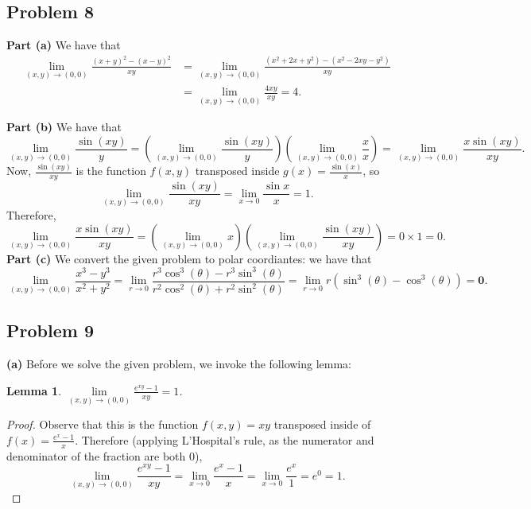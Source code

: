\documentclass[11pt]{article}
\newtheorem*{lemma*}{Lemma}
\begin{document}

\subsection{Problem 8}

\textbf{Part (a)} We have that 
\begin{align*}
	\lim\limits_{(x, y) \to (0, 0)} \frac{(x + y)^{2} - (x - y)^{2}}{xy} &= \lim\limits_{(x, y) \to (0, 0)} \frac{(x^{2} + 2x + y^{2}) - (x^{2} - 2xy - y^{2})}{xy} \\
	&= \lim\limits_{(x, y) \to (0, 0)} \frac{4xy}{xy} = 4.
\end{align*}

\textbf{Part (b)} We have that
\[
	\lim\limits_{(x, y) \to (0, 0)} \frac{\sin(xy)}{y} = \left( \lim\limits_{(x, y) \to (0, 0)} \frac{\sin(xy)}{y} \right) \left( \lim\limits_{(x, y) \to (0, 0)} \frac{x}{x} \right) = \lim\limits_{(x, y) \to (0, 0)} \frac{x\sin(xy)}{xy}.
\]
Now, $\tfrac{\sin(xy)}{xy}$ is the function $f(x, y)$ transposed inside $g(x) = \tfrac{\sin(x)}{x}$, so 
\[
	\lim\limits_{(x, y) \to (0, 0)} \frac{\sin(xy)}{xy} = \lim\limits_{x \to 0} \frac{\sin{x}}{x} = 1.
\]
Therefore,
\[
	\lim\limits_{(x, y) \to (0, 0)} \frac{x\sin(xy)}{xy} = \left( \lim\limits_{(x, y) \to (0, 0)} x \right) \left( \lim\limits_{(x, y) \to (0, 0)} \frac{\sin(xy)}{xy} \right) = 0 \times 1 = 0.
\]
\textbf{Part (c)} We convert the given problem to polar coordiantes: we have that
\[
	\lim\limits_{(x, y) \to (0, 0)} \frac{x^{3} - y^{3}}{x^{2} + y^{2}} = \lim\limits_{r \to 0} \frac{r^{3} \cos^{3}(\theta) - r^{3} \sin^{3}(\theta)}{r^{2}\cos^{2}(\theta) + r^{2}\sin^{2}(\theta)} = \lim\limits_{r \to 0} r (\sin^{3}(\theta) - \cos^{3}(\theta)) = \textbf{0}.
\]


\subsection{Problem 9}

\textbf{(a)} Before we solve the given problem, we invoke the following lemma:
\begin{adjustwidth}{1cm}{}
	\begin{lemma*}
		$\lim\limits_{(x, y) \to (0, 0)} \frac{e^{xy} - 1}{xy}= 1$.
	\end{lemma*}
    \begin{proof}\renewcommand{\qedsymbol}{}
		Observe that this is the function $f(x, y) = xy$ transposed inside of $f(x) = \tfrac{e^{x} - 1}{x}$. Therefore (applying L'Hospital's rule, as the numerator and denominator of the fraction are both $0$),
		\[
			\lim\limits_{(x, y) \to (0, 0)} \frac{e^{xy} - 1}{xy} = \lim\limits_{x \to 0} \frac{e^{x} - 1}{x} = \lim\limits_{x \to 0} \frac{e^{x}}{1} = e^{0} = 1.
		\]
	\end{proof}
\end{adjustwidth}
\end{document}
